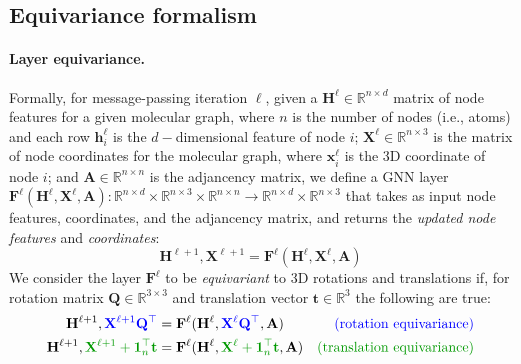 \subsection{Equivariance formalism}
\paragraph{Layer equivariance.}
Formally, for message-passing iteration $\ell$, given a $\mathbf{H}^{\ell}\in\mathbb{R}^{n \times d}$ matrix of node features for a given molecular graph, where $n$ is the number of nodes (i.e., atoms) and each row $\mathbf{h}^{\ell}_i$ is the $d-$dimensional feature of node $i$; $\textbf{X}^{\ell}\in \mathbb{R}^{n \times 3}$ is the matrix of node coordinates for the molecular graph, where $\mathbf{x}^{\ell}_i$ is the 3D coordinate of node $i$; and $\mathbf{A}\in\mathbb{R}^{n \times n}$ is the adjancency matrix, 
we define a GNN layer $\mathbf{F}^{\ell}(\mathbf{H}^{\ell}, \mathbf{X}^{\ell}, \mathbf{A}):\mathbb{R}^{n \times d}\times \mathbb{R}^{n \times 3} \times \mathbb{R}^{n \times n} \rightarrow \mathbb{R}^{n \times d} \times \mathbb{R}^{n \times 3}$ that takes as input node features, coordinates, and the adjancency matrix, and returns the \textit{updated node features} and \textit{coordinates}:
\begin{equation}
    \mathbf{H}^{\ell +1},\mathbf{X}^{\ell + 1} = \mathbf{F}^{\ell}(\mathbf{H}^{\ell}, \mathbf{X}^{\ell}, \mathbf{A})
\end{equation} 
We consider the layer $\mathbf{F}^{\ell}$ to be \textit{equivariant} to 3D rotations and translations if, for rotation matrix $\mathbf{Q}\in \mathbb{R}^{3 \times 3}$ and translation vector $\mathbf{t}\in \mathbb{R}^3$ the following are true:
\begin{align}
    \mathbf{H}^{\ell + 1}, {\color{blue}\mathbf{X}^{\ell + 1}\mathbf{Q}^{\top}} &= \mathbf{F}^{\ell}(\mathbf{H}^{\ell}, {\color{blue}\mathbf{X}^{\ell}\mathbf{Q}^{\top}}, \mathbf{A}) &\text{{\color{blue}(rotation equivariance)}} \\
    \mathbf{H}^{\ell + 1}, {\color{green!60!black}\mathbf{X}^{\ell + 1} + \mathbf{1}_n^{\top}\mathbf{t}} &= \mathbf{F}^{\ell}(\mathbf{H}^{\ell}, {\color{green!60!black}\mathbf{X}^{\ell} + \mathbf{1}_n^{\top}\mathbf{t}}, \mathbf{A}) &\text{{\color{green!60!black}(translation equivariance)}}
\end{align}
